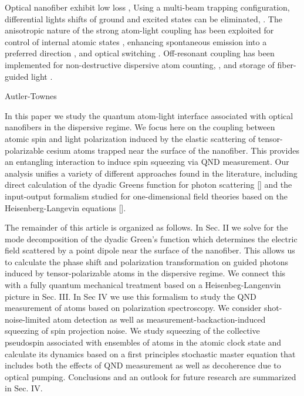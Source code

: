 \documentclass[preprint, aps,pra,onecolumn]{revtex4-1} %
\begin{document}
Optical nanofiber exhibit low loss \cite{hoffman_ultrahigh_2014}, 
Using a multi-beam trapping configuration, differential lights shifts of ground and excited states can be eliminated, \cite{lacroute_state-insensitive_2012}.
The anisotropic nature of the strong atom-light coupling has been exploited for control of internal atomic states \cite{mitsch_exploiting_2014}, enhancing spontaneous emission into a preferred direction \cite{petersen_chiral_2014, mitsch_quantum_2014}, and optical switching \cite{oshea_fiber-optical_2013}. 
Off-resonant coupling has been implemented for non-destructive dispersive atom counting, \cite{dawkins_dispersive_2011, beguin_generation_2014}, 
and storage of fiber-guided light \cite{gouraud_demonstration_2015, sayrin_storage_2015}.


Autler-Townes \cite{kumar_autler-townes_2015}


In this paper we study the quantum atom-light interface associated with optical nanofibers in the dispersive regime.  
We focus here on the coupling between atomic spin and light polarization induced by the elastic scattering of tensor-polarizable cesium atoms trapped near the surface of the nanofiber.  This provides an entangling interaction to induce spin squeezing via QND measurement.  Our analysis unifies a variety of different approaches found in the literature, including direct calculation of the dyadic Greens function for photon scattering [] and the input-output formalism studied for one-dimensional field theories based on the Heisenberg-Langevin equations [].

The remainder of this article is organized as follows.  In Sec. II we solve for the mode decomposition of the dyadic Green's function which determines the electric field scattered by a point dipole near the surface of the nanofiber.  This allows us to calculate the phase shift and polarization transformation on guided photons induced by tensor-polarizable atoms in the dispersive regime.  We connect this with a fully quantum mechanical treatment based on a Heisenbeg-Langenvin picture in Sec. III.  In Sec IV we use this formalism to study the QND measurement of atoms based on polarization spectroscopy.  We consider shot-noise-limited atom detection as well as measurement-backaction-induced squeezing of spin projection noise.  We study squeezing of the collective pseudospin associated with ensembles of atoms in the atomic clock state and calculate its dynamics based on a first principles stochastic master equation that includes both the effects of QND measurement as well as decoherence due to optical pumping.  Conclusions and an outlook for future research are summarized in Sec. IV.  
\end{document}
